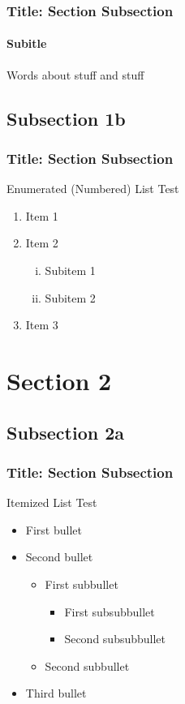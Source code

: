 \begin{frame}
\frametitle{Title: Section \thesection Subsection \thesubsection}
\framesubtitle{Subitle}
Words about stuff and stuff
\end{frame}

\subsection{Subsection 1b}

\begin{frame} \frametitle{Title: Section \thesection Subsection \thesubsection}

Enumerated (Numbered) List Test
\begin{enumerate}
    \item Item 1
    \item Item 2
    \begin{enumerate}[i)] %
        \item Subitem 1
        \item Subitem 2
    \end{enumerate}
    \item Item 3
\end{enumerate}
\end{frame}

\section{Section 2} %

\subsection{Subsection 2a}

\begin{frame}
\frametitle{Title: Section \thesection Subsection \thesubsection}
Itemized List Test
\begin{itemize}
    \item First bullet
    \item Second bullet
    \begin{itemize}
        \item First subbullet
        \begin{itemize}
            \item First subsubbullet
            \item Second subsubbullet
        \end{itemize}
        \item Second subbullet
    \end{itemize}
    \item Third bullet
\end{itemize}
\end{frame}


